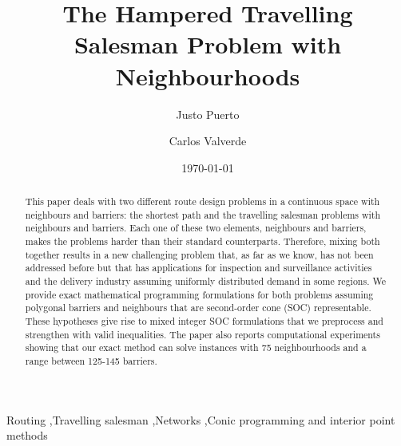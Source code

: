 \documentclass[a4paper,  review, authoryear, 1p.]{elsarticle}
\begin{document}
	
	\begin{frontmatter}
		
		\title{The Hampered Travelling Salesman Problem with Neighbourhoods}
		
		\author[1]{Justo Puerto }%
		
		\author[2]{Carlos Valverde }
		
		\address[1]{Department of Statistics and Operations Research, University of Seville, Seville, 41012, Spain}
		\address[2]{Department of Statistics and Operations Research, University of Seville, Seville, 41012, Spain}
		
		
		\date{\today}
		
		
		\begin{abstract}
			This paper deals with two different route design problems in a continuous space with neighbours and barriers: the shortest path and the travelling salesman problems with neighbours and barriers. Each one of these two elements, neighbours and barriers, makes the problems harder than their standard counterparts. Therefore, mixing both together results in a new challenging problem that, as far as we know, has not been addressed before but that has applications for inspection and surveillance activities and the delivery industry assuming uniformly distributed demand in some regions.
			We provide exact mathematical programming formulations for both problems assuming polygonal barriers and neighbours that are second-order cone (SOC) representable. These hypotheses give rise to mixed integer SOC formulations that we preprocess and strengthen with valid inequalities. The paper also reports computational experiments showing that our exact method can solve instances with 75 neighbourhoods and a range between 125-145 barriers.
		\end{abstract}
		
		\begin{keyword}
			Routing \sep Travelling salesman \sep Networks \sep Conic programming and interior point methods
		\end{keyword}
		
	\end{frontmatter}
	
\end{document}
